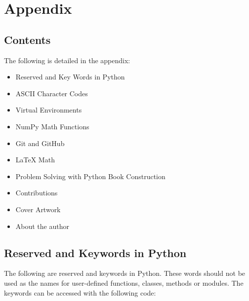 \documentclass{book}
\begin{document}
    




    
        \hypertarget{appendix}{%
\chapter{Appendix}\label{appendix}}
    




    
        \hypertarget{contents}{%
\section{Contents}\label{contents}}
    




    
        The following is detailed in the appendix:

\begin{itemize}
\item
  Reserved and Key Words in Python
\item
  ASCII Character Codes
\item
  Virtual Environments
\item
  NumPy Math Functions
\item
  Git and GitHub
\item
  LaTeX Math
\item
  Problem Solving with Python Book Construction
\item
  Contributions
\item
  Cover Artwork
\item
  About the author
\end{itemize}
        \newpage

    




    
        \hypertarget{reserved-and-keywords-in-python}{%
\section{Reserved and Keywords in
Python}\label{reserved-and-keywords-in-python}}
    




    
        The following are reserved and keywords in Python. These words should
not be used as the names for user-defined functions, classes, methods or
modules. The keywords can be accessed with the following code:
    
\end{document}
